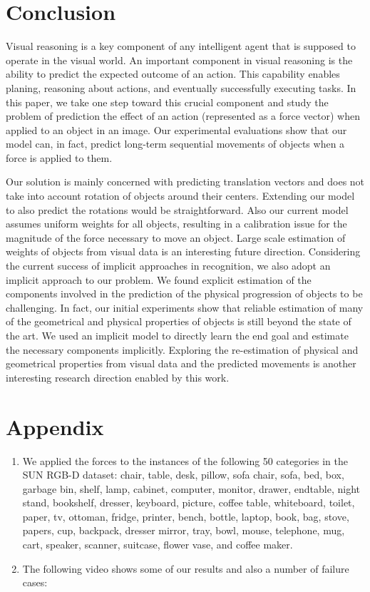 \documentclass[runningheads]{llncs}
\begin{document}
\section{Conclusion}
Visual reasoning is a key component of any intelligent agent that is supposed to operate in the visual world. An important component in visual reasoning is the ability to predict the expected outcome of an action. This capability enables planing, reasoning about actions, and eventually successfully executing tasks. In this paper, we take one step toward this crucial component and study the problem of prediction the effect of an action (represented as a force vector) when applied to an object in an image. Our experimental evaluations show that our model can, in fact, predict long-term sequential movements of objects when a force is applied to them. 

Our solution is mainly concerned with predicting translation vectors and does not take into account rotation of objects around their centers. Extending our model to also predict the rotations would be straightforward. Also our current model assumes uniform weights for all objects, resulting in a calibration issue for the magnitude of the force necessary to move an object. Large scale estimation of weights of objects from visual data is an interesting future direction. Considering the current success of implicit approaches in recognition, we also adopt an implicit approach to our problem. We found explicit estimation of the components involved in the prediction of the physical progression of objects to be challenging. In fact, our initial experiments show that reliable estimation of many of the geometrical and physical properties of objects is still beyond the state of the art. We used an implicit model to directly learn the end goal and estimate the necessary components implicitly. Exploring the re-estimation of physical and geometrical properties from visual data and the predicted movements is another interesting research direction enabled by this work.  

\section*{Appendix}
\begin{enumerate}
\item We applied the forces to the instances of the following 50 categories in the SUN RGB-D dataset: chair, table, desk, pillow, sofa chair, sofa, bed, box, garbage bin, shelf, lamp, cabinet, computer, monitor, drawer, endtable, night stand, bookshelf, dresser, keyboard, picture, coffee table, whiteboard, toilet, paper, tv, ottoman, fridge, printer, bench, bottle, laptop,    book, bag, stove, papers, cup, backpack, dresser mirror, tray, bowl, mouse, telephone, mug, cart, speaker, scanner, suitcase, flower vase, and coffee maker.

\item The following video shows some of our results and also a number of failure cases: 
\end{enumerate}




\end{document}
